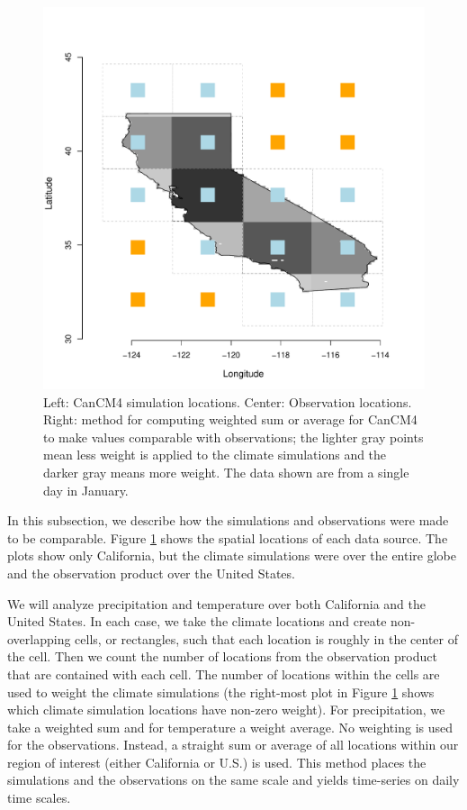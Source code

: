 \documentclass[12pt]{article}
\begin{document}
\begin{figure}
\begin{center}
\includegraphics[scale=0.26]{figs/cal_mod_box3.pdf}
\end{center}
\caption{Left: CanCM4 simulation locations. Center: Observation locations. Right: method for computing weighted sum or average for CanCM4 to make values comparable with observations; the lighter gray points mean less weight is applied to the climate simulations and the darker gray means more weight. The data shown are from a single day in January.}
\label{weight}
\end{figure}

In this subsection, we describe how the simulations and observations were made to be comparable. Figure \ref{weight} shows the spatial locations of each data source. The plots show only California, but the climate simulations were over the entire globe and the observation product over the United States.

We will analyze precipitation and temperature over both California and the United States. In each case, we take the climate locations and create non-overlapping cells, or rectangles, such that each location is roughly in the center of the cell. Then we count the number of locations from the observation product that are contained with each cell. The number of locations within the cells are used to weight the climate simulations (the right-most plot in Figure \ref{weight} shows which climate simulation locations have non-zero weight). For precipitation, we take a weighted sum and for temperature a weight average. No weighting is used for the observations. Instead, a straight sum or average of all locations within our region of interest (either California or U.S.) is used. This method places the simulations and the observations on the same scale and yields time-series on daily time scales.
\end{document}
